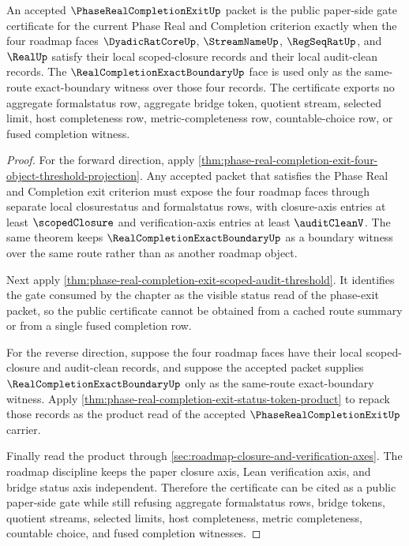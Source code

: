 \begin{theorem}
\label{thm:phase-real-completion-exit-public-gate-certificate}
An accepted $\PhaseRealCompletionExitUp$ packet is the public paper-side gate certificate for the current Phase Real and Completion criterion exactly when the four roadmap faces $\DyadicRatCoreUp$, $\StreamNameUp$, $\RegSeqRatUp$, and $\RealUp$ satisfy their local scoped-closure records and their local audit-clean records. The $\RealCompletionExactBoundaryUp$ face is used only as the same-route exact-boundary witness over those four records. The certificate exports no aggregate formalstatus row, aggregate bridge token, quotient stream, selected limit, host completeness row, metric-completeness row, countable-choice row, or fused completion witness.
\end{theorem}
\begin{proof}
For the forward direction, apply \autoref{thm:phase-real-completion-exit-four-object-threshold-projection}. Any accepted packet that satisfies the Phase Real and Completion exit criterion must expose the four roadmap faces through separate local closurestatus and formalstatus rows, with closure-axis entries at least $\scopedClosure$ and verification-axis entries at least $\auditCleanV$. The same theorem keeps $\RealCompletionExactBoundaryUp$ as a boundary witness over the same route rather than as another roadmap object.

Next apply \autoref{thm:phase-real-completion-exit-scoped-audit-threshold}. It identifies the gate consumed by the chapter as the visible status read of the phase-exit packet, so the public certificate cannot be obtained from a cached route summary or from a single fused completion row.

For the reverse direction, suppose the four roadmap faces have their local scoped-closure and audit-clean records, and suppose the accepted packet supplies $\RealCompletionExactBoundaryUp$ only as the same-route exact-boundary witness. Apply \autoref{thm:phase-real-completion-exit-status-token-product} to repack those records as the product read of the accepted $\PhaseRealCompletionExitUp$ carrier.

Finally read the product through \autoref{sec:roadmap-closure-and-verification-axes}. The roadmap discipline keeps the paper closure axis, Lean verification axis, and bridge status axis independent. Therefore the certificate can be cited as a public paper-side gate while still refusing aggregate formalstatus rows, bridge tokens, quotient streams, selected limits, host completeness, metric completeness, countable choice, and fused completion witnesses.
\end{proof}

